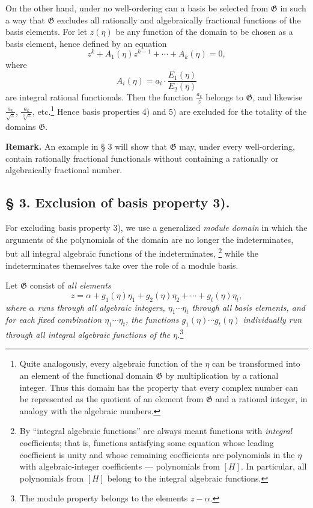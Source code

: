 \documentclass[11pt]{article}
\begin{document}
On the other hand, under no well-ordering can a basis be selected from
$\mathfrak G$ in such a way that $\mathfrak G$ excludes all rationally and
algebraically fractional functions of the basis elements. For let $z(\eta)$ be any
function of the domain to be chosen as a basis element, hence defined by an
equation
\[
 z^k+A_1(\eta)z^{k-1}+\cdots+A_k(\eta)=0,
\]
where
\[
 A_i(\eta)=a_i\cdot\frac{E_1(\eta)}{E_2(\eta)}
\]
are integral rational functionals. Then the function
$\frac{a_k}{z}$ belongs to $\mathfrak G$, and likewise
$\frac{a_k}{\sqrt z}$, $\frac{a_k}{\sqrt[3]z}$, etc.\footnote{Quite analogously,
every algebraic function of the $\eta$ can be transformed into an element of the
functional domain $\mathfrak G$ by multiplication by a rational integer. Thus
this domain has the property that every complex number can be represented as the
quotient of an element from $\mathfrak G$ and a rational integer, in analogy with
the algebraic numbers.} Hence basis properties 4) and 5) are excluded for the
totality of the domains $\mathfrak G$.

\textbf{Remark.} An example in § 3 will show that $\mathfrak G$ may, under every
well-ordering, contain rationally fractional functionals without containing a
rationally or algebraically fractional number.

\subsection*{§ 3. Exclusion of basis property 3).}

For excluding basis property 3), we use a generalized \emph{module domain} in
which the arguments of the polynomials of the domain are no longer the
indeterminates, but all integral algebraic functions of the indeterminates,
\footnote{By ``integral algebraic functions'' are always meant functions with
\emph{integral} coefficients; that is, functions satisfying some equation whose
leading coefficient is unity and whose remaining coefficients are polynomials in
the $\eta$ with algebraic-integer coefficients --- polynomials from $[H]$. In
particular, all polynomials from $[H]$ belong to the integral algebraic
functions.} while the indeterminates themselves take over the role of a module
basis.

Let $\mathfrak G$ consist of \emph{all elements}
\begin{equation}
 z=\alpha+g_1(\eta)\eta_1+g_2(\eta)\eta_2+\cdots+g_t(\eta)\eta_t,
\tag{1}
\end{equation}
\emph{where $\alpha$ runs through all algebraic integers,
$\eta_1\cdots\eta_t$ through all basis elements, and for each fixed combination
$\eta_1\cdots\eta_t$, the functions
$g_1(\eta)\cdots g_t(\eta)$ individually run through all integral algebraic
functions of the $\eta$.}\footnote{The module property belongs to the elements
$z-\alpha$.}
\end{document}
